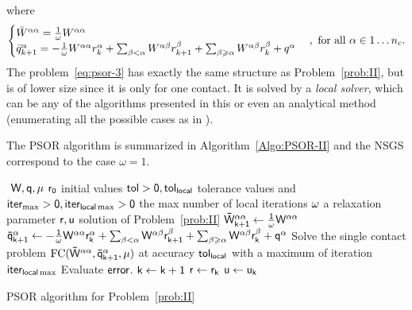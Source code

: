 where
\begin{equation}
  \label{eq:psor-2}
  \begin{cases}
    \Bar W^{\alpha\alpha} = \frac 1 \omega W^{\alpha\alpha} \\
    \bar q^{\alpha}_{k+1} = - \frac 1 \omega W^{\alpha\alpha} r^{\alpha}_{k}
    + \sum_{\beta < \alpha}W^{\alpha\beta} r^{\beta}_{k+1} + \sum_{\beta
      \geq \alpha}W^{\alpha\beta} r^{\beta}_{k} + q^\alpha
  \end{cases}
, \text{ for all } \alpha \in 1\ldots n_c.
\end{equation}
The problem~\eqref{eq:psor-3} has exactly the same structure as Problem~\ref{prob:II}, but is of lower size since it is only for one contact.
It is solved by a \emph{local solver}, which can be any of the algorithms presented in this \chapterorreport{} or even an analytical method (enumerating all the possible cases as in \citep{bonnefon:inria-00553859}).


The PSOR algorithm is summarized in Algorithm~\ref{Algo:PSOR-II} and the NSGS correspond to the case $\omega=1$.
%
\begin{algorithm}
  \begin{algorithmic}
    {\sf
      \STATE $ $ 
      \REQUIRE $\sf W,q,\mu$
      \REQUIRE $\sf r_0$ initial values
      \REQUIRE $\sf tol >0, tol_{{local }}$  tolerance values and $\sf iter_{\max}  >0, \sf iter_{local \max}  >0$ the max number of local iterations
      \REQUIRE $\sf \omega$ a relaxation parameter 
      \ENSURE  $\sf r,u$ solution of Problem~\ref{prob:II}
      \STATE $\sf \bar W^{\alpha\alpha}_{k+1} \leftarrow  \frac 1 \omega W^{\alpha\alpha}$
      \STATE $\sf   \bar q^{\alpha}_{k+1} \leftarrow - \frac 1 \omega W^{\alpha\alpha} r^{\alpha}_{k}
      + \sum_{\beta < \alpha}W^{\alpha\beta} r^{\beta}_{k+1} + \sum_{\beta
        \geq \alpha}W^{\alpha\beta} r^{\beta}_{k} + q^\alpha $
      \STATE Solve the single contact problem $\sf \mathrm{FC}(\bar W^{\alpha\alpha},\bar q^{\alpha}_{k+1},\mu)$ at accuracy $\sf tol_{{local }}$ with a maximum of iteration $\sf iter_{local \max}$
      \ENDFOR
      \STATE Evaluate $\sf error$.
      \STATE $\sf k \leftarrow k+1$ 
      \ENDWHILE
      \STATE $\sf r \leftarrow r_{k}$ 
      \STATE $\sf u \leftarrow u_{k}$ 
    }
  \end{algorithmic}
  \caption{PSOR algorithm for Problem~\ref{prob:II}}  \label{Algo:PSOR-II}
\end{algorithm}

